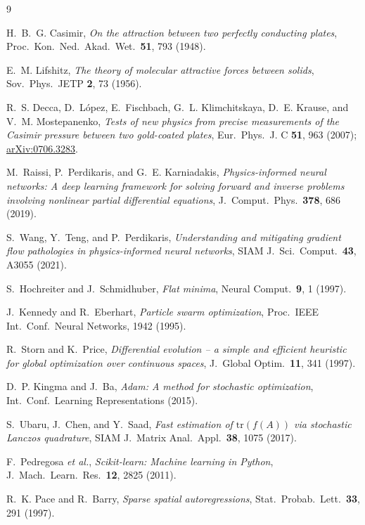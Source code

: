 \documentclass[10pt,twocolumn]{article}
\begin{document}
\begin{thebibliography}{9}
\small

H.~B.~G. Casimir,
\emph{On the attraction between two perfectly conducting plates},
Proc.\ Kon.\ Ned.\ Akad.\ Wet.\ \textbf{51}, 793 (1948).

E.~M. Lifshitz,
\emph{The theory of molecular attractive forces between solids},
Sov.\ Phys.\ JETP \textbf{2}, 73 (1956).

R.~S. Decca, D.~L\'opez, E.~Fischbach, G.~L. Klimchitskaya, D.~E. Krause, and
V.~M. Mostepanenko,
\emph{Tests of new physics from precise measurements of the Casimir pressure between two
gold-coated plates},
Eur.\ Phys.\ J. C \textbf{51}, 963 (2007);
\href{https://arxiv.org/abs/0706.3283}{arXiv:0706.3283}.

M.~Raissi, P.~Perdikaris, and G.~E. Karniadakis,
\emph{Physics-informed neural networks: A deep learning framework for solving forward and
inverse problems involving nonlinear partial differential equations},
J.\ Comput.\ Phys.\ \textbf{378}, 686 (2019).

S.~Wang, Y.~Teng, and P.~Perdikaris,
\emph{Understanding and mitigating gradient flow pathologies in physics-informed neural
networks},
SIAM J.\ Sci.\ Comput.\ \textbf{43}, A3055 (2021).

S.~Hochreiter and J.~Schmidhuber,
\emph{Flat minima},
Neural Comput.\ \textbf{9}, 1 (1997).

J.~Kennedy and R.~Eberhart,
\emph{Particle swarm optimization},
Proc.\ IEEE Int.\ Conf.\ Neural Networks, 1942 (1995).

R.~Storn and K.~Price,
\emph{Differential evolution -- a simple and efficient heuristic for global optimization over
continuous spaces},
J.\ Global Optim.\ \textbf{11}, 341 (1997).

D.~P. Kingma and J.~Ba,
\emph{Adam: A method for stochastic optimization},
Int.\ Conf.\ Learning Representations (2015).

S.~Ubaru, J.~Chen, and Y.~Saad,
\emph{Fast estimation of $\mathrm{tr}(f(A))$ via stochastic Lanczos quadrature},
SIAM J.\ Matrix Anal.\ Appl.\ \textbf{38}, 1075 (2017).

F.~Pedregosa \emph{et al.},
\emph{Scikit-learn: Machine learning in Python},
J.\ Mach.\ Learn.\ Res.\ \textbf{12}, 2825 (2011).

R.~K. Pace and R.~Barry,
\emph{Sparse spatial autoregressions},
Stat.\ Probab.\ Lett.\ \textbf{33}, 291 (1997).

\end{thebibliography}
\end{document}
